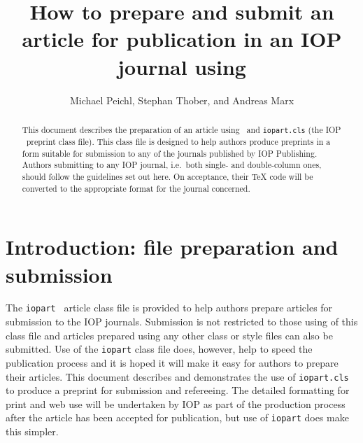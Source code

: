 \documentclass[12pt]{iopart}
\begin{document}
\title[Author guidelines for IOP journals in  \LaTeXe]{How to prepare and submit an article for 
publication in an IOP journal using \LaTeXe}

\author{Michael Peichl, Stephan Thober, and Andreas Marx}

\address{UFZ - Helmholtz Centre for Environmental Research, Leipzig, Germany}

\begin{abstract}
This document describes the  preparation of an article using \LaTeXe\ and 
\verb"iopart.cls" (the IOP \LaTeXe\ preprint class file).
This class file is designed to help 
authors produce preprints in a form suitable for submission to any of the
journals published by IOP Publishing.
Authors submitting to any IOP journal, i.e.\ 
both single- and double-column ones, should follow the guidelines set out here. 
On acceptance, their TeX code will be converted to 
the appropriate format for the journal concerned.

\end{abstract}

\maketitle
\section{Introduction: file preparation and submission}
The \verb"iopart" \LaTeXe\ article class file is provided to help authors prepare articles for submission to the IOP journals. Submission is not restricted to those using of this class file and articles prepared using any other class or style files can also be submitted. Use of the \verb"iopart" class file does, however, help to speed the publication process and it is hoped it will make it easy for authors to prepare their articles. This document describes and demonstrates the use of \verb"iopart.cls" to produce a preprint for submission and refereeing. The detailed formatting for print and web use will be undertaken by IOP as part of the production process after the article has been accepted for publication, but use of \verb"iopart" does make this simpler.
\end{document}

